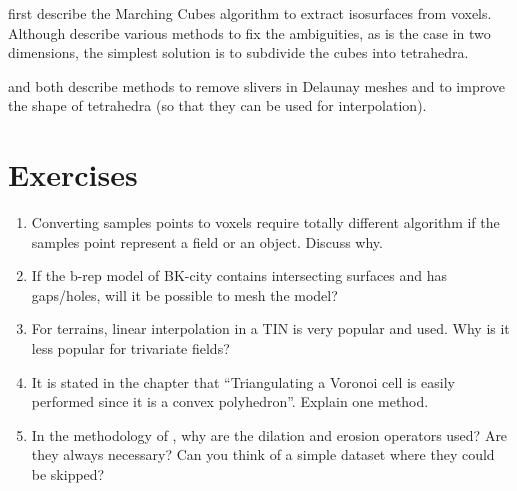 \citet{Lorensen87} first describe the Marching Cubes algorithm to extract isosurfaces from voxels.
Although \citet{Wilhems90} describe various methods to fix the ambiguities, as is the case in two dimensions, the simplest solution is to subdivide the cubes into tetrahedra.

\citet{Cheng00} and \citet{Miller02} both describe methods to remove slivers in Delaunay meshes and to improve the shape of tetrahedra (so that they can be used for interpolation).

%
\section{Exercises}

\begin{enumerate}
  \item Converting samples points to voxels require totally different algorithm if the samples point represent a field or an object. Discuss why.
  \item If the b-rep model of BK-city contains intersecting surfaces and has gaps/holes, will it be possible to mesh the model?
  \item For terrains, linear interpolation in a TIN is very popular and used. Why is it less popular for trivariate fields?
  \item It is stated in the chapter that ``Triangulating a Voronoi cell is easily performed since it is a convex polyhedron''. Explain one method.
  \item In the methodology of \citet{Donkers16}, why are the dilation and erosion operators used? Are they always necessary? Can you think of a simple dataset where they could be skipped?
\end{enumerate}
